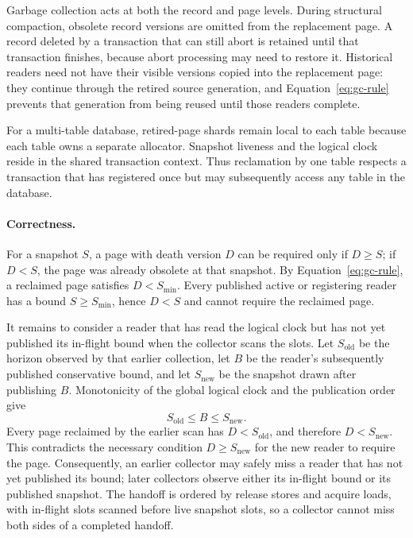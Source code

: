 \documentclass[11pt]{article}
\begin{document}
Garbage collection acts at both the record and page levels. During structural
compaction, obsolete record versions are omitted from the replacement page. A record
deleted by a transaction that can still abort is retained until that transaction
finishes, because abort processing may need to restore it. Historical readers need not
have their visible versions copied into the replacement page: they continue through the
retired source generation, and Equation~\ref{eq:gc-rule} prevents that generation from
being reused until those readers complete.

For a multi-table database, retired-page shards remain local to each table because each
table owns a separate allocator. Snapshot liveness and the logical clock reside in the
shared transaction context. Thus reclamation by one table respects a transaction that
has registered once but may subsequently access any table in the database.

\paragraph{Correctness.}
For a snapshot $S$, a page with death version $D$ can be required only if $D \geq S$;
if $D < S$, the page was already obsolete at that snapshot. By
Equation~\ref{eq:gc-rule}, a reclaimed page satisfies $D < S_{\min}$. Every published
active or registering reader has a bound $S \geq S_{\min}$, hence $D < S$ and cannot
require the reclaimed page.

It remains to consider a reader that has read the logical clock but has not yet
published its in-flight bound when the collector scans the slots. Let $S_{\mathrm{old}}$
be the horizon observed by that earlier collection, let $B$ be the reader's subsequently
published conservative bound, and let $S_{\mathrm{new}}$ be the snapshot drawn after
publishing $B$. Monotonicity of the global logical clock and the publication order give
\begin{equation}
  S_{\mathrm{old}} \leq B \leq S_{\mathrm{new}}.
\end{equation}
Every page reclaimed by the earlier scan has $D < S_{\mathrm{old}}$, and therefore
$D < S_{\mathrm{new}}$. This contradicts the necessary condition
$D \geq S_{\mathrm{new}}$ for the new reader to require the page. Consequently, an
earlier collector may safely miss a reader that has not yet published its bound; later
collectors observe either its in-flight bound or its published snapshot. The handoff is
ordered by release stores and acquire loads, with in-flight slots scanned before live
snapshot slots, so a collector cannot miss both sides of a completed handoff.
\end{document}

